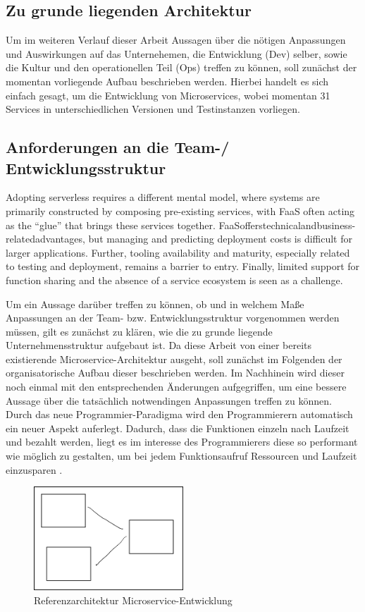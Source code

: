 \documentclass[11pt]{article}
\begin{document}
\subsection{Zu grunde liegenden Architektur}
Um im weiteren Verlauf dieser Arbeit Aussagen über die nötigen Anpassungen und Auswirkungen auf das Unternehemen, die Entwicklung (Dev) selber, sowie die Kultur und den operationellen Teil (Ops) treffen zu können, soll zunächst der momentan vorliegende Aufbau beschrieben werden. Hierbei handelt es sich einfach gesagt, um die Entwicklung von Microservices, wobei momentan 31 Services in unterschiedlichen Versionen und Testinstanzen vorliegen. 



\subsection{Anforderungen an die Team-/ Entwicklungsstruktur}

Adopting serverless requires a diﬀerent mental model, where systems are primarily constructed by composing pre-existing services, with FaaS often acting as the “glue” that brings these services together. FaaSoﬀerstechnicalandbusiness-relatedadvantages, but managing and predicting deployment costs is diﬃcult for larger applications. Further, tooling availability and maturity, especially related to testing and deployment, remains a barrier to entry. Finally, limited support for function sharing and the absence of a service ecosystem is seen as a challenge.  \cite{leitner2019mixed}

Um ein Aussage darüber treffen zu können, ob und in welchem Maße Anpassungen an der Team- bzw. Entwicklungsstruktur vorgenommen werden müssen, gilt es zunächst zu klären, wie die zu grunde liegende Unternehmensstruktur aufgebaut ist. Da diese Arbeit von einer bereits existierende Microservice-Architektur ausgeht, soll zunächst im Folgenden der organisatorische Aufbau dieser beschrieben werden. Im Nachhinein wird dieser noch einmal mit den entsprechenden Änderungen aufgegriffen, um eine bessere Aussage über die tatsächlich notwendingen Anpassungen treffen zu können.
Durch das neue Programmier-Paradigma wird den Programmierern automatisch ein neuer Aspekt auferlegt. Dadurch, dass die Funktionen einzeln nach Laufzeit und bezahlt werden, liegt es im interesse des Programmierers diese so performant wie möglich zu gestalten, um bei jedem Funktionsaufruf Ressourcen und Laufzeit einzusparen \cite{shafiei2020serverless}. 

\begin{figure}[h]
\caption{Referenzarchitektur Microservice-Entwicklung}
\centering
\includegraphics[width=0.5\textwidth]{test}
\end{figure}
\end{document}
